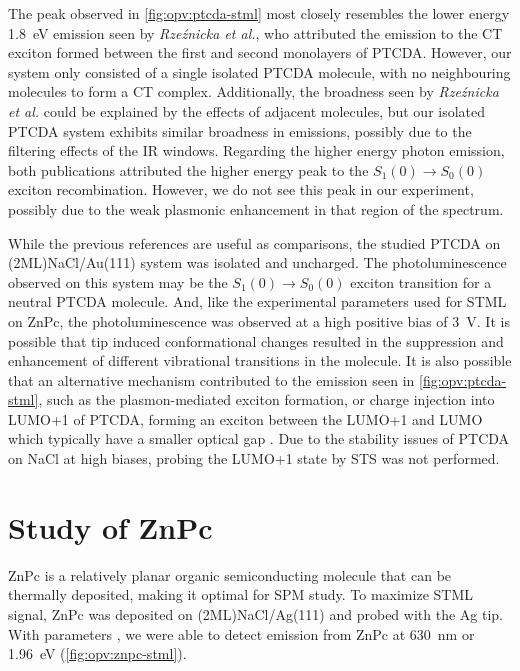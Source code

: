 The peak observed in \autoref{fig:opv:ptcda-stml} most closely resembles the lower energy \SI{1.8}{eV} emission seen by \textit{Rze\'znicka et al.}, who attributed the emission to the \ac{CT} exciton formed between the first and second monolayers of PTCDA. However, our system only consisted of a single isolated PTCDA molecule, with no neighbouring molecules to form a \ac{CT} complex. Additionally, the broadness seen by \textit{Rze\'znicka et al.} could be explained by the effects of adjacent molecules, but our isolated PTCDA system exhibits similar broadness in emissions, possibly due to the filtering effects of the IR windows. Regarding the higher energy photon emission, both publications attributed the higher energy peak to the $S_1(0) \rightarrow S_0(0)$ exciton recombination. However, we do not see this peak in our experiment, possibly due to the weak plasmonic enhancement in that region of the spectrum.

While the previous references are useful as comparisons, the studied PTCDA on (2ML)NaCl/Au(111) system was isolated and uncharged. The photoluminescence observed on this system may be the $S_1(0) \rightarrow S_0(0)$ exciton transition for a neutral PTCDA molecule. And, like the experimental parameters used for \ac{STML} on ZnPc, the photoluminescence was observed at a high positive bias of \SI{3}{V}. It is possible that tip induced conformational changes resulted in the suppression and enhancement of different vibrational transitions in the molecule. It is also possible that an alternative mechanism contributed to the emission seen in \autoref{fig:opv:ptcda-stml}, such as the plasmon-mediated exciton formation, or charge injection into LUMO+1 of PTCDA, forming an exciton between the LUMO+1 and LUMO which typically have a smaller optical gap \citep{Wu2008}. Due to the stability issues of PTCDA on NaCl at high biases, probing the LUMO+1 state by \ac{STS} was not performed.




\section{Study of {ZnPc}}

\ac{ZnPc} is a relatively planar organic semiconducting molecule that can be thermally deposited, making it optimal for \ac{SPM} study. To maximize \ac{STML} signal, ZnPc was deposited on (2ML)NaCl/Ag(111) and probed with the Ag tip. With parameters , we were able to detect emission from ZnPc at \SI{630}{nm} or \SI{1.96}{eV} (\autoref{fig:opv:znpc-stml}).

